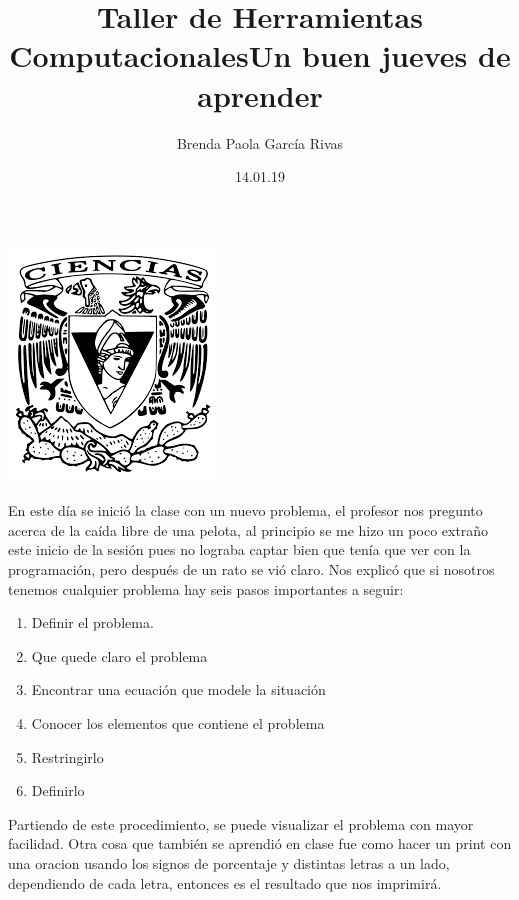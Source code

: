 \documentclass[letterpaper, 12pt,oneside]{article}
\title{\huge\color{orange}Taller de Herramientas Computacionales}
\author{Brenda Paola García Rivas}
\date{14.01.19}
\begin{document}
	\maketitle
	\begin{center}
		\includegraphics[scale=0.98]{1.png}
	\end{center}
	\newpage
	\title{\huge Un buen jueves de aprender\\}
	
	En este día se inició la clase con un nuevo problema, el profesor nos pregunto acerca de la caída libre de una pelota, al principio se me hizo un poco extraño este inicio de la sesión pues no lograba captar bien que tenía que ver con la programación, pero después de un rato se vió claro. 
	Nos explicó que si nosotros tenemos cualquier problema hay seis pasos importantes a seguir:
	\begin{enumerate}
		\item
		Definir el problema. 
		\item 
		Que quede claro el problema
		\item 
		Encontrar una ecuación que modele la situación
		\item 
		Conocer los elementos que contiene el problema
		\item 
		Restringirlo
		\item 
		Definirlo
	\end{enumerate}
	Partiendo de este procedimiento, se puede visualizar el problema con mayor facilidad. Otra cosa que también se aprendió en clase fue como hacer un print con una oracion usando los signos de porcentaje y distintas letras a un lado, dependiendo de cada letra, entonces es el resultado que nos imprimirá.
\end{document}
